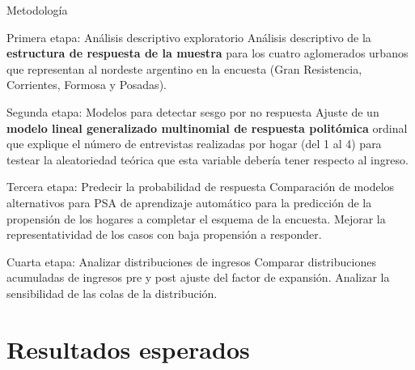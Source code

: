 \documentclass[10pt]{beamer}
\begin{document}
\begin{frame}[allowframebreaks]{Metodología}


\begin{alertblock}{Primera etapa: Análisis descriptivo exploratorio}
Análisis descriptivo de la \textbf{estructura de respuesta de la muestra} para los cuatro aglomerados urbanos que representan al nordeste argentino en la encuesta (Gran Resistencia, Corrientes, Formosa y Posadas).
\end{alertblock}

\begin{alertblock}{Segunda etapa: Modelos para detectar sesgo por no respuesta}
Ajuste de un \textbf{modelo lineal generalizado multinomial de respuesta politómica} ordinal que explique el número de entrevistas realizadas por hogar (del 1 al 4) para testear la aleatoriedad teórica que esta variable debería tener respecto al ingreso.
\end{alertblock}

\begin{alertblock}{Tercera etapa: Predecir la probabilidad de respuesta} 
Comparación de modelos alternativos para PSA de aprendizaje automático para la predicción de la propensión de los hogares a completar el esquema de la encuesta. Mejorar la representatividad de los casos con baja propensión a responder.
\end{alertblock}

\begin{alertblock}{Cuarta etapa: Analizar distribuciones de ingresos}
Comparar distribuciones acumuladas de ingresos pre y post ajuste del factor de expansión. Analizar la sensibilidad de las colas de la distribución.    
\end{alertblock}

\end{frame}

\section{Resultados esperados}
\end{document}
